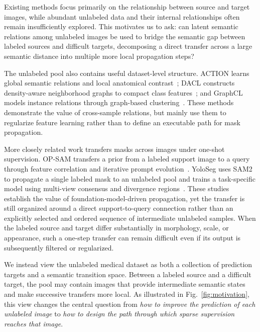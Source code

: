 \documentclass[a4paper,fleqn]{cas-dc}
\begin{document}
Existing methods focus primarily on the relationship between source and target images, while abundant unlabeled data and their internal relationships often remain insufficiently explored. This motivates us to ask: can latent semantic relations among unlabeled images be used to bridge the semantic gap between labeled sources and difficult targets, decomposing a direct transfer across a large semantic distance into multiple more local propagation steps?

The unlabeled pool also contains useful dataset-level structure. ACTION learns global semantic relations and local anatomical contrast~\cite{you2022action}; DACL constructs density-aware neighborhood graphs to compact class features~\cite{tang2024dacl}; and GraphCL models instance relations through graph-based clustering~\cite{wang2024graphcl}. These methods demonstrate the value of cross-sample relations, but mainly use them to regularize feature learning rather than to define an executable path for mask propagation.

More closely related work transfers masks across images under one-shot supervision. OP-SAM transfers a prior from a labeled support image to a query through feature correlation and iterative prompt evolution~\cite{mao2025opsam}. YoloSeg uses SAM2 to propagate a single labeled mask to an unlabeled pool and trains a task-specific model using multi-view consensus and divergence regions~\cite{zhang2026yoloseg}. These studies establish the value of foundation-model-driven propagation, yet the transfer is still organized around a direct support-to-query connection rather than an explicitly selected and ordered sequence of intermediate unlabeled samples. When the labeled source and target differ substantially in morphology, scale, or appearance, such a one-step transfer can remain difficult even if its output is subsequently filtered or regularized.



We instead view the unlabeled medical dataset as both a collection of prediction targets and a semantic transition space. Between a labeled source and a difficult target, the pool may contain images that provide intermediate semantic states and make successive transfers more local. As illustrated in Fig.~\ref{fig:motivation}, this view changes the central question from \emph{how to improve the prediction of each unlabeled image} to \emph{how to design the path through which sparse supervision reaches that image}.
\end{document}

